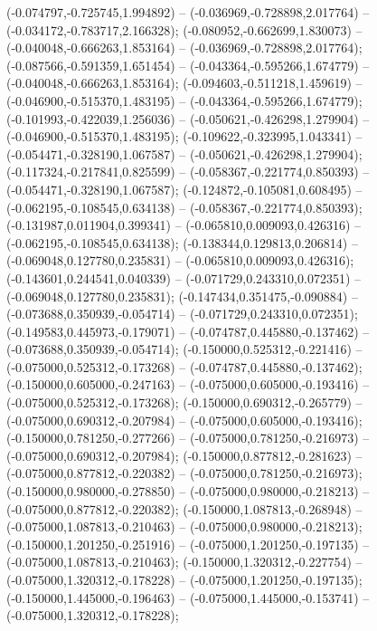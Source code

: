  (-0.074797,-0.725745,1.994892) -- (-0.036969,-0.728898,2.017764) -- (-0.034172,-0.783717,2.166328);
 (-0.080952,-0.662699,1.830073) -- (-0.040048,-0.666263,1.853164) -- (-0.036969,-0.728898,2.017764);
 (-0.087566,-0.591359,1.651454) -- (-0.043364,-0.595266,1.674779) -- (-0.040048,-0.666263,1.853164);
 (-0.094603,-0.511218,1.459619) -- (-0.046900,-0.515370,1.483195) -- (-0.043364,-0.595266,1.674779);
 (-0.101993,-0.422039,1.256036) -- (-0.050621,-0.426298,1.279904) -- (-0.046900,-0.515370,1.483195);
 (-0.109622,-0.323995,1.043341) -- (-0.054471,-0.328190,1.067587) -- (-0.050621,-0.426298,1.279904);
 (-0.117324,-0.217841,0.825599) -- (-0.058367,-0.221774,0.850393) -- (-0.054471,-0.328190,1.067587);
 (-0.124872,-0.105081,0.608495) -- (-0.062195,-0.108545,0.634138) -- (-0.058367,-0.221774,0.850393);
 (-0.131987,0.011904,0.399341) -- (-0.065810,0.009093,0.426316) -- (-0.062195,-0.108545,0.634138);
 (-0.138344,0.129813,0.206814) -- (-0.069048,0.127780,0.235831) -- (-0.065810,0.009093,0.426316);
 (-0.143601,0.244541,0.040339) -- (-0.071729,0.243310,0.072351) -- (-0.069048,0.127780,0.235831);
 (-0.147434,0.351475,-0.090884) -- (-0.073688,0.350939,-0.054714) -- (-0.071729,0.243310,0.072351);
 (-0.149583,0.445973,-0.179071) -- (-0.074787,0.445880,-0.137462) -- (-0.073688,0.350939,-0.054714);
 (-0.150000,0.525312,-0.221416) -- (-0.075000,0.525312,-0.173268) -- (-0.074787,0.445880,-0.137462);
 (-0.150000,0.605000,-0.247163) -- (-0.075000,0.605000,-0.193416) -- (-0.075000,0.525312,-0.173268);
 (-0.150000,0.690312,-0.265779) -- (-0.075000,0.690312,-0.207984) -- (-0.075000,0.605000,-0.193416);
 (-0.150000,0.781250,-0.277266) -- (-0.075000,0.781250,-0.216973) -- (-0.075000,0.690312,-0.207984);
 (-0.150000,0.877812,-0.281623) -- (-0.075000,0.877812,-0.220382) -- (-0.075000,0.781250,-0.216973);
 (-0.150000,0.980000,-0.278850) -- (-0.075000,0.980000,-0.218213) -- (-0.075000,0.877812,-0.220382);
 (-0.150000,1.087813,-0.268948) -- (-0.075000,1.087813,-0.210463) -- (-0.075000,0.980000,-0.218213);
 (-0.150000,1.201250,-0.251916) -- (-0.075000,1.201250,-0.197135) -- (-0.075000,1.087813,-0.210463);
 (-0.150000,1.320312,-0.227754) -- (-0.075000,1.320312,-0.178228) -- (-0.075000,1.201250,-0.197135);
 (-0.150000,1.445000,-0.196463) -- (-0.075000,1.445000,-0.153741) -- (-0.075000,1.320312,-0.178228);
